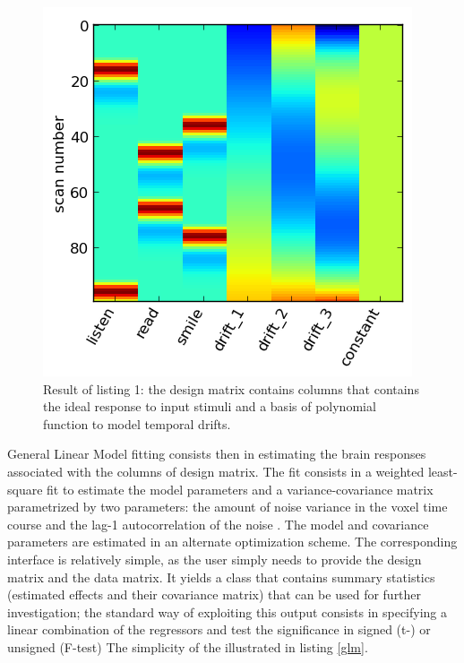 \documentclass{bioinfo}
\begin{document}
\begin{widetext}

\end{widetext}
\begin{figure}
\begin{center}
\includegraphics[width=.8\linewidth]{dmtx.png}
\end{center}
\caption{ Result of listing 1: the design matrix contains columns that
  contains the ideal response to input stimuli and a basis of
  polynomial function to model temporal drifts.}
\label{fig:dmtx}
\end{figure}


General Linear Model fitting consists then in estimating the brain
responses associated with the columns of design matrix.
%
The fit consists in a weighted least-square fit to estimate the model
parameters and a variance-covariance matrix parametrized by two
parameters: the amount of noise variance in the voxel time course and
the lag-1 autocorrelation of the noise \cite{Bullmore1996}. 
%
The model and covariance parameters are estimated in an alternate
optimization scheme.
%
The corresponding interface is relatively simple, as the user simply
needs to provide the design matrix and the data matrix. 
%
It yields a class that contains summary statistics (estimated effects
and their covariance matrix) that can be used for further
investigation; the standard way of exploiting this output consists in
specifying a linear combination of the regressors and test the
significance in signed (t-) or unsigned (F-test)
%
The simplicity of the illustrated in listing \ref{glm}.
\end{document}
